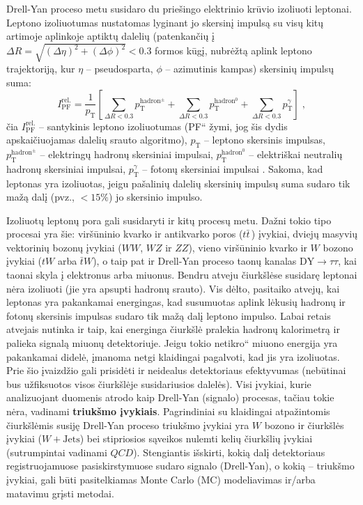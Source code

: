\documentclass[a4paper, 12pt, oneside]{article}
\newcommand{\pT}{p_{\mathrm{T}}}
\newcommand{\ZZ}{Z\! Z}
\newcommand{\WZ}{W\! Z}
\newcommand{\tbarW}{\bar{t}W}
\newcommand{\ttbar}{t\bar{t}}
\newcommand{\WJets}{W\! +\!\mathrm{Jets}}
\newcommand{\DYtau}{\mathrm{DY} \! \rightarrow \! \tau\tau}
\newcommand{\ltq}[1]{{\quotedblbase{}#1\textquotedblleft{}}}
\newcommand{\QCD}{QC\! D}
\newlength\q
\begin{document}
Drell-Yan proceso metu susidaro du priešingo elektrinio krūvio izoliuoti leptonai.
Leptono izoliuotumas nustatomas lyginant jo skersinį impulsą su visų kitų artimoje aplinkoje aptiktų dalelių
(patenkančių į $\Delta R = \sqrt{(\Delta\eta)^2 + (\Delta\phi)^2} < 0.3$ formos kūgį, nubrėžtą aplink leptono
trajektoriją, kur $\eta$ -- pseudosparta, $\phi$ -- azimutinis kampas) skersinių impulsų suma:
\begin{equation}
	\label{eq:Iso}
	I^{\mathrm{rel.}}_{\mathrm{PF}} = \frac{1}{p_{\mathrm{T}}} 
	\left[ \sum_{\Delta R<0.3} p_{\mathrm{T}}^{\mathrm{hadron^{\pm}}} +
	\sum_{\Delta R<0.3} p_{\mathrm{T}}^{\mathrm{hadron^0}} + 
	\sum_{\Delta R<0.3} p_{\mathrm{T}}^{\gamma} \right] \; \mathrm{,}
\end{equation}
čia $I^{\mathrm{rel.}}_{\mathrm{PF}}$ -- santykinis leptono izoliuotumas (\ltq{PF} žymi, jog šis dydis apskaičiuojamas
dalelių srauto algoritmo), $\pT$ -- leptono skersinis impulsas,
$p_{\mathrm{T}}^{\mathrm{hadron^{\pm}}}$ -- elektringų hadronų skersiniai impulsai,
$p_{\mathrm{T}}^{\mathrm{hadron^0}}$ -- elektriškai neutralių hadronų skersiniai impulsai,
$p_{\mathrm{T}}^{\gamma}$ -- fotonų skersiniai impulsai \cite{ParticleFlow}.
Sakoma, kad leptonas yra izoliuotas, jeigu pašalinių dalelių skersinių impulsų suma sudaro tik mažą dalį (pvz., $<15\%$)
jo skersinio impulso.

Izoliuotų leptonų pora gali susidaryti ir kitų procesų metu.
Dažni tokio tipo procesai yra šie: viršūninio kvarko ir antikvarko poros ($\ttbar\,$) įvykiai, dviejų masyvių vektorinių bozonų
įvykiai ($WW$, $\WZ$ ir $\ZZ$), vieno viršūninio kvarko ir $W$ bozono įvykiai ($tW$ arba $\tbarW$), o taip pat ir
Drell-Yan proceso taonų kanalas $\DYtau$, kai taonai skyla į elektronus arba miuonus.
Bendru atveju čiurkšlėse susidarę leptonai nėra izoliuoti (jie yra apsupti hadronų srauto).
Vis dėlto, pasitaiko atvejų, kai leptonas yra pakankamai energingas, kad susumuotas aplink lėkusių hadronų ir fotonų
skersinis impulsas sudaro tik mažą dalį leptono impulso.
Labai retais atvejais nutinka ir taip, kai energinga čiurkšlė pralekia hadronų kalorimetrą ir palieka signalą miuonų
detektoriuje.
Jeigu tokio \ltq{netikro} miuono energija yra pakankamai didelė, įmanoma netgi klaidingai pagalvoti, kad jis yra izoliuotas.
Prie šio įvaizdžio gali prisidėti ir neidealus detektoriaus efektyvumas (nebūtinai bus užfiksuotos visos čiurkšlėje
susidariusios dalelės).
Visi įvykiai, kurie analizuojant duomenis atrodo kaip Drell-Yan (signalo) procesas, tačiau tokie nėra, vadinami
\textbf{triukšmo įvykiais}.
Pagrindiniai su klaidingai atpažintomis čiurkšlėmis susiję Drell-Yan proceso triukšmo įvykiai yra $W$ bozono ir  čiurkšlės
įvykiai ($\WJets$) bei stipriosios sąveikos nulemti kelių čiurkšlių įvykiai (sutrumpintai vadinami $\QCD$).
Stengiantis išskirti, kokią dalį detektoriaus registruojamuose pasiskirstymuose sudaro signalo (Drell-Yan),
o kokią -- triukšmo įvykiai, gali būti pasitelkiamas Monte Carlo (MC) modeliavimas ir/arba matavimu grįsti metodai.
\end{document}
